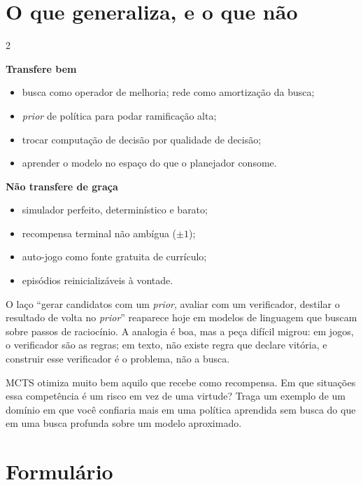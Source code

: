 \documentclass[a4paper, 11pt]{article}
\begin{document}
\section{O que generaliza, e o que não}

\begin{multicols}{2}
{\small
\textbf{\color{rlVerde!70!black}Transfere bem}
\begin{itemize}
  \item busca como operador de melhoria; rede como amortização da busca;
  \item \emph{prior} de política para podar ramificação alta;
  \item trocar computação de decisão por qualidade de decisão;
  \item aprender o modelo no espaço do que o planejador consome.
\end{itemize}

\columnbreak

\textbf{\color{rlVermelho}Não transfere de graça}
\begin{itemize}
  \item simulador perfeito, determinístico e barato;
  \item recompensa terminal não ambígua ($\pm1$);
  \item auto-jogo como fonte gratuita de currículo;
  \item episódios reinicializáveis à vontade.
\end{itemize}}
\end{multicols}

O laço ``gerar candidatos com um \emph{prior}, avaliar com um verificador,
destilar o resultado de volta no \emph{prior}'' reaparece hoje em modelos de
linguagem que buscam sobre passos de raciocínio. A analogia é boa, mas a peça
difícil migrou: em jogos, o verificador são as regras; em texto, não existe
regra que declare vitória, e construir esse verificador é o problema, não a
busca.

\begin{discbox}
MCTS otimiza muito bem aquilo que recebe como recompensa. Em que situações essa
competência é um risco em vez de uma virtude? Traga um exemplo de um domínio em
que você confiaria mais em uma política aprendida sem busca do que em uma busca
profunda sobre um modelo aproximado.
\end{discbox}

\needspace{0.32\textheight}
\section{Formulário}
\end{document}
